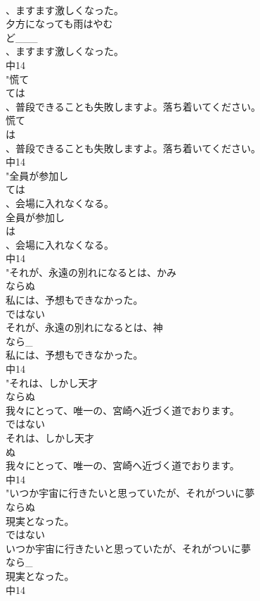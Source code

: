 \documentclass[8pt]{extreport}
\begin{document}
\begin{CJK}{UTF8}{min}
\\	、ますます激しくなった。
\\	夕方になっても雨はやむ
\\	ど___
\\	、ますます激しくなった。
\\	中14
\\	"慌て
\\	ては
\\	、普段できることも失敗しますよ。落ち着いてください。
\\	慌て
\\	は
\\	、普段できることも失敗しますよ。落ち着いてください。
\\	中14
\\	"全員が参加し
\\	ては
\\	、会場に入れなくなる。
\\	全員が参加し
\\	は
\\	、会場に入れなくなる。
\\	中14
\\	"それが、永遠の別れになるとは、かみ
\\	ならぬ
\\	私には、予想もできなかった。
\\	ではない
\\	それが、永遠の別れになるとは、神
\\	なら_
\\	私には、予想もできなかった。
\\	中14
\\	"それは、しかし天才
\\	ならぬ
\\	我々にとって、唯一の、宮崎へ近づく道でおります。
\\	ではない
\\	それは、しかし天才
\\	ぬ
\\	我々にとって、唯一の、宮崎へ近づく道でおります。
\\	中14
\\	"いつか宇宙に行きたいと思っていたが、それがついに夢
\\	ならぬ
\\	現実となった。
\\	ではない
\\	いつか宇宙に行きたいと思っていたが、それがついに夢
\\	なら_
\\	現実となった。
\\	中14

\end{CJK}
\end{document}
